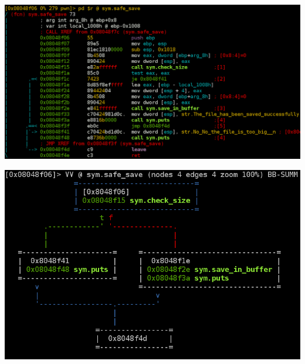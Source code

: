 {
\begin{frame}[plain]
  \begin{center}
    \includegraphics[width=\textwidth]{./images/radare-disas.png}
  \end{center}
\end{frame}

\begin{frame}[plain]
  \begin{center}
    \includegraphics[width=\textwidth]{./images/radare-disas3.png}
  \end{center}
\end{frame}

}
